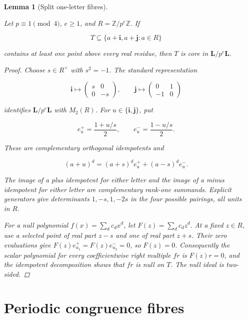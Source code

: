 \documentclass[11pt]{article}
\newtheorem{lemma}[theorem]{Lemma}
\numberwithin{equation}{section}
\begin{document}
\begin{lemma}[Split one-letter fibres]
\label{lem:split}

Let $p\equiv1\pmod4$, $e\ge1$, and
$R=\mathbb Z/p^e\mathbb Z$. If

\[
T\subseteq\{a+\mathbf i,a+\mathbf j:a\in R\}
\]

contains at least one point above every real residue, then $T$ is core in
$\mathbf L/p^e\mathbf L$.

\begin{proof}

Choose $s\in R^\times$ with $s^2=-1$. The standard representation

\[
\mathbf i\longmapsto
\begin{pmatrix}s&0\\0&-s\end{pmatrix},
\qquad
\mathbf j\longmapsto
\begin{pmatrix}0&1\\-1&0\end{pmatrix}
\]

identifies $\mathbf L/p^e\mathbf L$ with $M_2(R)$. For
$u\in\{\mathbf i,\mathbf j\}$, put

\[
e_u^+=\frac{1+u/s}{2},
\qquad
e_u^-=\frac{1-u/s}{2}.
\]

These are complementary orthogonal idempotents and

\[
(a+u)^d=(a+s)^d e_u^+ +(a-s)^d e_u^-.
\]

The image of a plus idempotent for either letter and the image of a minus
idempotent for either letter are complementary rank-one summands. Explicit
generators give determinants $1,-s,1,-2s$ in the four possible pairings,
all units in $R$.

For a null polynomial $f(x)=\sum_dc_dx^d$, let
$F(z)=\sum_dc_dz^d$. At a fixed $z\in R$, use a selected point of real part
$z-s$ and one of real part $z+s$. Their zero evaluations give
$F(z)e_{u_1}^+=F(z)e_{u_2}^-=0$, so $F(z)=0$. Consequently the scalar
polynomial for every coefficientwise right multiple $fr$ is
$F(z)r=0$, and the idempotent decomposition shows that $fr$ is null on
$T$. The null ideal is two-sided.
\end{proof}

\end{lemma}


\section{Periodic congruence fibres}
\end{document}
